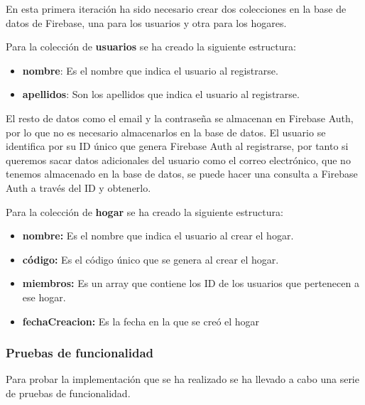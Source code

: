 En esta primera iteración ha sido necesario crear dos colecciones en la base de datos de Firebase, 
una para los usuarios y otra para los hogares. 

Para la colección de \textbf{usuarios} se ha creado la siguiente estructura:
\begin{itemize}
    \item \textbf{nombre}: Es el nombre que indica el usuario al registrarse.
    \item \textbf{apellidos}: Son los apellidos que indica el usuario al registrarse.
\end{itemize}

El resto de datos como el email y la contraseña se almacenan en Firebase Auth, por lo que no es necesario almacenarlos en la base de datos.
El usuario se identifica por su ID único que genera Firebase Auth al registrarse, por tanto si queremos sacar datos adicionales del usuario como el correo electrónico,
que no tenemos almacenado en la base de datos, se puede hacer una consulta a Firebase Auth a través del ID y obtenerlo.

Para la colección de \textbf{hogar} se ha creado la siguiente estructura: 
\begin{itemize}
    \item \textbf{nombre:} Es el nombre que indica el usuario al crear el hogar.
    \item \textbf{código:} Es el código único que se genera al crear el hogar.
    \item \textbf{miembros:} Es un array que contiene los ID de los usuarios que pertenecen a ese hogar.
    \item \textbf{fechaCreacion:} Es la fecha en la que se creó el hogar
\end{itemize}


\subsubsection{Pruebas de funcionalidad}

Para probar la implementación que se ha realizado se ha llevado a cabo una serie de pruebas de funcionalidad.

